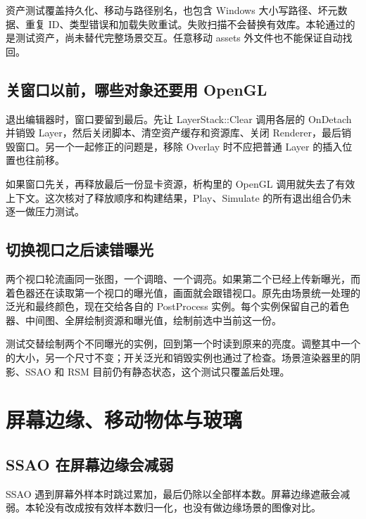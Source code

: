 资产测试覆盖持久化、移动与路径别名，也包含 Windows 大小写路径、坏元数据、重复 ID、类型错误和加载失败重试。失败扫描不会替换有效库。本轮通过的是测试资产，尚未替代完整场景交互。任意移动 assets 外文件也不能保证自动找回。

\subsection{关窗口以前，哪些对象还要用 OpenGL}
退出编辑器时，窗口要留到最后。先让 LayerStack::Clear 调用各层的 OnDetach 并销毁 Layer，然后关闭脚本、清空资产缓存和资源库、关闭 Renderer，最后销毁窗口。另一个一起修正的问题是，移除 Overlay 时不应把普通 Layer 的插入位置也往前移。

如果窗口先关，再释放最后一份显卡资源，析构里的 OpenGL 调用就失去了有效上下文。这次核对了释放顺序和构建结果，Play、Simulate 的所有退出组合仍未逐一做压力测试。

\subsection{切换视口之后读错曝光}
两个视口轮流画同一张图，一个调暗、一个调亮。如果第二个已经上传新曝光，而着色器还在读取第一个视口的曝光值，画面就会跟错视口。原先由场景统一处理的泛光和最终颜色，现在交给各自的 PostProcess 实例。每个实例保留自己的着色器、中间图、全屏绘制资源和曝光值，绘制前选中当前这一份。

测试交替绘制两个不同曝光的实例，回到第一个时读到原来的亮度。调整其中一个的大小，另一个尺寸不变；开关泛光和销毁实例也通过了检查。场景渲染器里的阴影、SSAO 和 RSM 目前仍有静态状态，这个测试只覆盖后处理。

\newpage


\newpage


\newpage


\newpage
\section{屏幕边缘、移动物体与玻璃}
\subsection{SSAO 在屏幕边缘会减弱}
SSAO 遇到屏幕外样本时跳过累加，最后仍除以全部样本数。屏幕边缘遮蔽会减弱。本轮没有改成按有效样本数归一化，也没有做边缘场景的图像对比。

